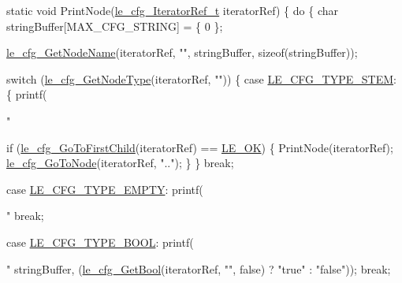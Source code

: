 \begin{DoxyCode}
\textcolor{keyword}{static} \textcolor{keywordtype}{void} PrintNode(\hyperlink{le__cfg__interface_8h_a646829934bb23a878e19ade2c3e01eba}{le\_cfg\_IteratorRef\_t} iteratorRef)
\{
    \textcolor{keywordflow}{do}
    \{
        \textcolor{keywordtype}{char} stringBuffer[MAX\_CFG\_STRING] = \{ 0 \};

        \hyperlink{le__cfg__interface_8h_a02c84283bc9c62a490e9c7cf3f3d5598}{le\_cfg\_GetNodeName}(iteratorRef, \textcolor{stringliteral}{""}, stringBuffer, \textcolor{keyword}{sizeof}(stringBuffer));

        \textcolor{keywordflow}{switch} (\hyperlink{le__cfg__interface_8h_a31df1f796da5a18a74de1110c549d6f8}{le\_cfg\_GetNodeType}(iteratorRef, \textcolor{stringliteral}{""}))
        \{
            \textcolor{keywordflow}{case} \hyperlink{le__cfg__interface_8h_a29c8480b3310d1235487d7ea96d8b57dab720da857c99845f5fac9499b3bfed4e}{LE\_CFG\_TYPE\_STEM}:
                \{
                    printf(\textcolor{stringliteral}{"%

                    \textcolor{keywordflow}{if} (\hyperlink{le__cfg__interface_8h_abb7ab8d52ca9bf5e0977341e18740079}{le\_cfg\_GoToFirstChild}(iteratorRef) == 
      \hyperlink{le__basics_8h_a1cca095ed6ebab24b57a636382a6c86ca5066a4bcec691c6b67843b8f79656422}{LE\_OK})
                    \{
                        PrintNode(iteratorRef);
                        \hyperlink{le__cfg__interface_8h_a3a8519b471bc6f4a5fea3716636dc607}{le\_cfg\_GoToNode}(iteratorRef, \textcolor{stringliteral}{".."});
                    \}
                \}
                \textcolor{keywordflow}{break};

            \textcolor{keywordflow}{case} \hyperlink{le__cfg__interface_8h_a29c8480b3310d1235487d7ea96d8b57da545f7e9317020efc82e268c2c08b7e4b}{LE\_CFG\_TYPE\_EMPTY}:
                printf(\textcolor{stringliteral}{"%
                \textcolor{keywordflow}{break};

            \textcolor{keywordflow}{case} \hyperlink{le__cfg__interface_8h_a29c8480b3310d1235487d7ea96d8b57dafe64ea58a518cef6fbeefe9ee8fea944}{LE\_CFG\_TYPE\_BOOL}:
                printf(\textcolor{stringliteral}{"%
                       stringBuffer,
                       (\hyperlink{le__cfg__interface_8h_aa3898fcb0d62b03c9a238d36b42d7a63}{le\_cfg\_GetBool}(iteratorRef, \textcolor{stringliteral}{""}, \textcolor{keyword}{false}) ? \textcolor{stringliteral}{"true"} : \textcolor{stringliteral}{"false"}));
                \textcolor{keywordflow}{break};

}}}
\end{DoxyCode}
